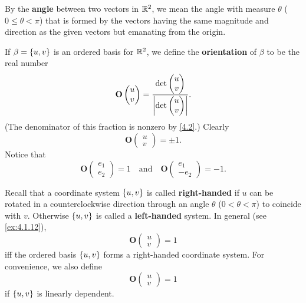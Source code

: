 \begin{defn}\label{4.1.2}
  By the \textbf{angle} between two vectors in \(\mathbb{R}^2\), we mean the angle with measure \(\theta\) (\(0 \leq \theta < \pi\)) that is formed by the vectors having the same magnitude and direction as the given vectors but emanating from the origin.

  If \(\beta = \left\lbrace u, v\right\rbrace\) is an ordered basis for \(\mathbb{R}^2\), we define the \textbf{orientation} of \(\beta\) to be the real number
  \[
    \mathbf{O}\begin{pmatrix}
      u \\
      v
    \end{pmatrix} = \frac{\det\begin{pmatrix}
        u \\
        v
      \end{pmatrix}}{\left\lvert\det\begin{pmatrix}
          u \\
          v
        \end{pmatrix}\right\rvert}.
  \]
  (The denominator of this fraction is nonzero by \cref{4.2}.)
  Clearly
  \[
    \mathbf{O}\begin{pmatrix}
      u \\
      v
    \end{pmatrix} = \pm 1.
  \]
  Notice that
  \[
    \mathbf{O}\begin{pmatrix}
      e_1 \\
      e_2
    \end{pmatrix} = 1 \quad \text{and} \quad \mathbf{O}\begin{pmatrix}
      e_1 \\
      -e_2
    \end{pmatrix} = -1.
  \]

  Recall that a coordinate system \(\left\lbrace u, v\right\rbrace\) is called \textbf{right-handed} if \(u\) can be rotated in a counterclockwise direction through an angle \(\theta\) (\(0 < \theta < \pi\)) to coincide with \(v\).
  Otherwise \(\left\lbrace u, v\right\rbrace\) is called a \textbf{left-handed} system.
  In general (see \cref{ex:4.1.12}),
  \[
    \mathbf{O}\begin{pmatrix}
      u \\
      v
    \end{pmatrix} = 1
  \]
  iff the ordered basis \(\left\lbrace u, v\right\rbrace\) forms a right-handed coordinate system.
  For convenience, we also define
  \[
    \mathbf{O}\begin{pmatrix}
      u \\
      v
    \end{pmatrix} = 1
  \]
  if \(\left\lbrace u, v\right\rbrace\) is linearly dependent.
\end{defn}

